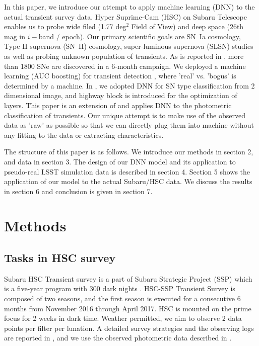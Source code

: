 \documentclass[proof]{pasj01}
\begin{document}
In this paper, we introduce our attempt to apply machine learning (DNN) to the actual transient survey data.
Hyper Suprime-Cam (HSC) \citep{miyazaki18a,Komiyama2018,kawanomoto18a,Furusawa2018} on Subaru Telescope enables us to probe wide filed (1.77 deg$^2$ Field of View) and deep space (26th mag in $i-$band / epoch).  Our primary scientific goals are SN~Ia cosmology, Type II supernova (SN~II) cosmology, super-luminous supernova (SLSN) studies as well as probing unknown population of transients.  
As is reported in \citet{yasuda19a}, more than 1800 SNe are discovered in a 6-month campaign. 
We deployed a machine learning (AUC boosting) for transient detection \citep{morii16a}, where 'real' vs. 'bogus' is determined by a machine.
In \citet{Kimura17}, we adopted DNN for SN type classification from 2 dimensional image, and highway block is introduced for the optimization of layers.
This paper is an extension of \citet{Kimura17} and applies DNN to the photometric classification of transients.   
Our unique attempt is to make use of the observed data as 'raw' as possible so that we can directly plug them into machine without any fitting to the data or extracting characteristics.

The structure of this paper is as follows. We introduce our methods in section 2, and data in section 3. The design of our DNN model and its application to pseudo-real LSST simulation data is described in section 4. Section 5 shows the application of our model to the actual Subaru/HSC data. We discuss the results in section 6 and conclusion is given in section 7.
%
%

\section{Methods}
\subsection{Tasks in HSC survey}
\label{sec:tasks}
Subaru HSC Transient survey is a part of Subaru Strategic Project (SSP) which is a five-year program with 300 dark nights \citep{aihara18a,miyazaki18a}.
HSC-SSP Transient Survey is composed of two seasons, and the first season is executed for a consecutive 6 months from November 2016 through April 2017.
HSC is mounted on the prime focus for 2 weeks in dark time.   
Weather permitted, we aim to observe 2 data points per filter per lunation.
A detailed survey strategies and the observing logs are reported in \citet{yasuda19a}, and we use the observed photometric data described in \citet{yasuda19a}.
\end{document}
